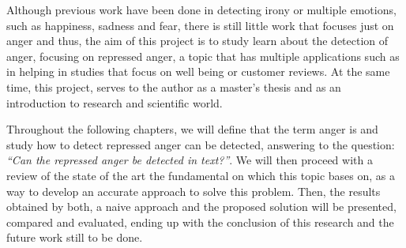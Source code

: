 Although previous work have been done in detecting irony or multiple emotions, such as happiness, sadness and fear, there is still little work that focuses just on anger and thus, the aim of this project is to study learn about the detection of anger, focusing on repressed anger, a topic that has multiple applications such as in helping in studies that focus on well being or customer reviews. At the same time, this project, serves to the author as a master's thesis and as an introduction to research and scientific world.

Throughout the following chapters, we will define that the term anger is and study how to detect repressed anger can be detected, answering to the question: \textit{``Can the repressed anger be detected in text?''}. We will then proceed with a review of the state of the art the fundamental on which this topic bases on, as a way to develop an accurate approach to solve this problem. Then, the results obtained by both, a naive approach and the proposed solution will be presented, compared and evaluated, ending up with the conclusion of this research and the future work still to be done.

\iffalse

